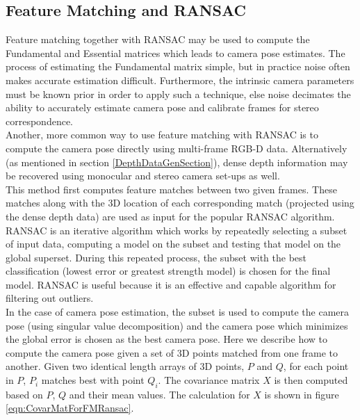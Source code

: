 \subsection{Feature Matching and RANSAC}
\label{FMANDFM}

Feature matching together with RANSAC may be used to compute the Fundamental and Essential matrices which leads to camera pose estimates. The process of estimating the Fundamental matrix simple, but in practice noise often makes accurate estimation difficult. Furthermore, the intrinsic camera parameters must be known prior in order to apply such a technique, else noise decimates the ability to accurately estimate camera pose and calibrate frames for stereo correspondence. \\

Another, more common way to use feature matching with RANSAC \cite{Fischler81Random,Chen99Ransac} is to compute the camera pose directly using multi-frame RGB-D data. Alternatively (as mentioned in section \ref{DepthDataGenSection}), dense depth information may be recovered using monocular and stereo camera set-ups as well. \\

This method first computes feature matches between two given frames. These matches along with the 3D location of each corresponding match (projected using the dense depth data) are used as input for the popular RANSAC algorithm.\\

RANSAC is an iterative algorithm which works by repeatedly selecting a subset of input data, computing a model on the subset and testing that model on the global superset. During this repeated process, the subset with the best classification (lowest error or greatest strength model) is chosen for the final model. RANSAC is useful because it is an effective and capable algorithm for filtering out outliers. \\

In the case of camera pose estimation, the subset is used to compute the camera pose (using singular value decomposition) and the camera pose which minimizes the global error is chosen as the best camera pose. Here we describe how to compute the camera pose given a set of 3D points matched from one frame to another. Given two identical length arrays of 3D points, $P$ and $Q$, for each point in $P$, $P_i$ matches best with point $Q_i$. The covariance matrix $X$ is then computed based on $P$, $Q$ and their mean values. The calculation for $X$ is shown in figure \ref{eqn:CovarMatForFMRansac}.


